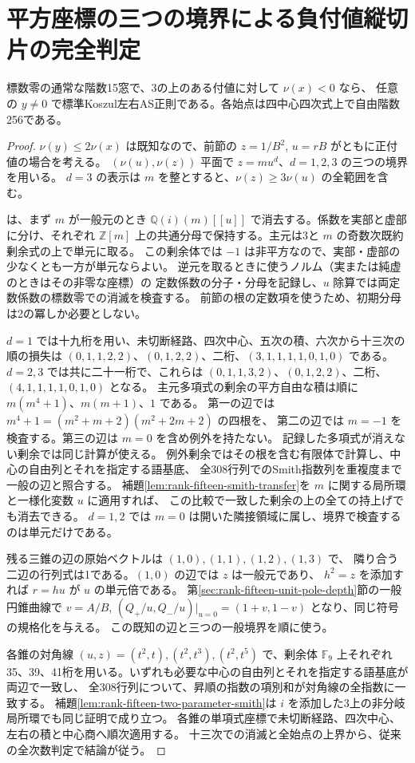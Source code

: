 \section{平方座標の三つの境界による負付値縦切片の完全判定}
\label{sec:rank-fifteen-negative-x-fan}
\begin{theorem}\label{thm:rank-fifteen-negative-x-fan}
標数零の通常な階数15窓で、3の上のある付値に対して $\nu(x)<0$ なら、
任意の $y\ne0$ で標準Koszul左右AS正則である。各始点は四中心四次式上で自由階数256である。
\end{theorem}
\begin{proof}
$\nu(y)\le2\nu(x)$ は既知なので、前節の $z=1/B^2$, $u=rB$ がともに正付値の場合を考える。
$(\nu(u),\nu(z))$ 平面で $z=mu^d$、$d=1,2,3$ の三つの境界を用いる。
$d=3$ の表示は $m$ を整とすると、$\nu(z)\ge3\nu(u)$ の全範囲を含む。

 は、まず $m$ が一般元のとき
$\mathbb Q(i)(m)[[u]]$ で消去する。係数を実部と虚部に分け、それぞれ
$\mathbb Z[m]$ 上の共通分母で保持する。主元は3と $m$ の奇数次既約剰余式の上で単元に取る。
この剰余体では $-1$ は非平方なので、実部・虚部の少なくとも一方が単元ならよい。
逆元を取るときに使うノルム（実または純虚のときはその非零な座標）の
定数係数の分子・分母を記録し、$u$ 除算では両定数係数の標数零での消滅を検査する。
前節の根の定数項を使うため、初期分母は2の冪しか必要としない。

$d=1$ では十九桁を用い、未切断経路、四次中心、五次の積、六次から十三次の順の損失は
$(0,1,1,2,2)$、$(0,1,2,2)$、二桁、$(3,1,1,1,1,0,1,0)$ である。
$d=2,3$ では共に二十一桁で、これらは
$(0,1,1,3,2)$、$(0,1,2,2)$、二桁、$(4,1,1,1,1,0,1,0)$ となる。
主元多項式の剰余の平方自由な積は順に $m(m^4+1)$、$m(m+1)$、$1$ である。
第一の辺では $m^4+1=(m^2+m+2)(m^2+2m+2)$ の四根を、
第二の辺では $m=-1$ を検査する。第三の辺は $m=0$ を含め例外を持たない。
記録した多項式が消えない剰余では同じ計算が使える。
例外剰余ではその根を含む有限体で計算し、中心の自由列とそれを指定する語基底、
全308行列でのSmith指数列を重複度まで一般の辺と照合する。
補題\ref{lem:rank-fifteen-smith-transfer}を $m$ に関する局所環と一様化変数 $u$ に適用すれば、
この比較で一致した剰余の上の全ての持上げでも消去できる。
$d=1,2$ では $m=0$ は開いた隣接領域に属し、境界で検査するのは単元だけである。

残る三錐の辺の原始ベクトルは $(1,0),(1,1),(1,2),(1,3)$ で、
隣り合う二辺の行列式は1である。$(1,0)$ の辺では $z$ は一般元であり、
$h^2=z$ を添加すれば $r=hu$ が $u$ の単元倍である。
第\ref{sec:rank-fifteen-unit-pole-depth}節の一般円錐曲線で $v=A/B$,
$(Q_+/u,Q_-/u)|_{u=0}=(1+v,1-v)$ となり、同じ符号の規格化を与える。
この既知の辺と三つの一般境界を順に使う。

各錐の対角線 $(u,z)=(t^2,t),(t^2,t^3),(t^2,t^5)$ で、剰余体 $\mathbb F_9$ 上それぞれ
35、39、41桁を用いる。いずれも必要な中心の自由列とそれを指定する語基底が両辺で一致し、
全308行列について、昇順の指数の項別和が対角線の全指数に一致する。
補題\ref{lem:rank-fifteen-two-parameter-smith}は $i$ を添加した3上の非分岐局所環でも同じ証明で成り立つ。
各錐の単項式座標で未切断経路、四次中心、左右の積と中心商へ順次適用する。
十三次での消滅と全始点の上界から、従来の全次数判定で結論が従う。
\end{proof}

